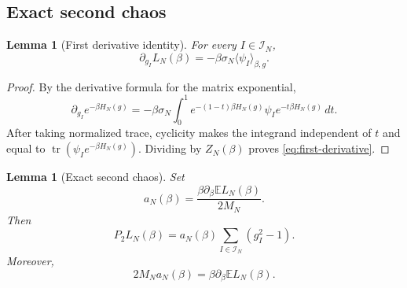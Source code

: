 \documentclass[11pt]{article}
\newtheorem{lemma}[theorem]{Lemma}
\newcommand{\E}{\mathbb{E}}
\newcommand{\tr}{\operatorname{tr}}
\newcommand{\calI}{\mathcal{I}}
\newcommand{\dd}{\,d}
\begin{document}
\subsection{Exact second chaos}

\begin{lemma}[First derivative identity]\label{lem:first-derivative}
  For every $I\in\calI_N$,
  \begin{equation}\label{eq:first-derivative}
    \partial_{g_I}L_N(\beta)=-\beta\sigma_N\langle\psi_I\rangle_{\beta,g}.
  \end{equation}
\end{lemma}

\begin{proof}
  By the derivative formula for the matrix exponential,
  \begin{equation}\label{eq:exp-derivative}
    \partial_{g_I}e^{-\beta H_N(g)}
    =
    -\beta\sigma_N
    \int_0^1
      e^{-(1-t)\beta H_N(g)}\psi_I e^{-t\beta H_N(g)}
    \dd t.
  \end{equation}
  After taking normalized trace, cyclicity makes the integrand independent of
  $t$ and equal to $\tr(\psi_Ie^{-\beta H_N(g)})$.  Dividing by $Z_N(\beta)$
  proves \eqref{eq:first-derivative}.
\end{proof}

\begin{lemma}[Exact second chaos]\label{lem:second-chaos}
  Set
  \begin{equation}\label{eq:an-explicit-def}
    a_N(\beta)=\frac{\beta\partial_\beta\E L_N(\beta)}{2M_N}.
  \end{equation}
  Then
  \begin{equation}\label{eq:p2-exact}
    P_2L_N(\beta)=a_N(\beta)\sum_{I\in\calI_N}(g_I^2-1).
  \end{equation}
  Moreover,
  \begin{equation}\label{eq:an-coeff}
    2M_Na_N(\beta)=\beta\partial_\beta\E L_N(\beta).
  \end{equation}
\end{lemma}
\end{document}
